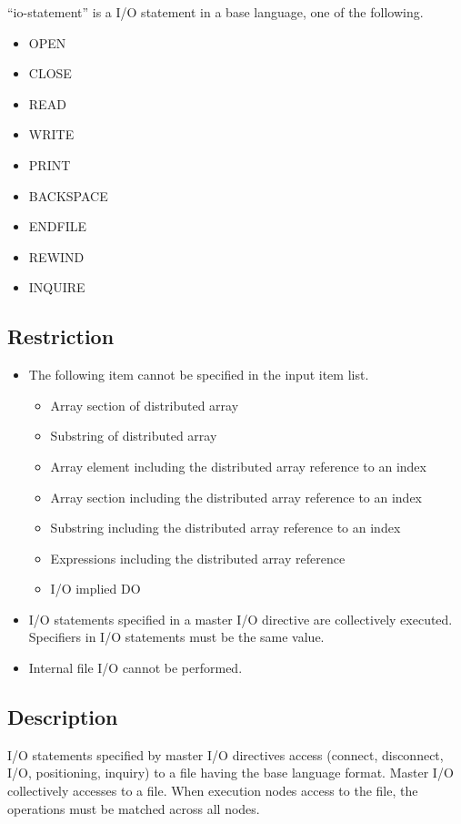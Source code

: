    ``io-statement'' is a I/O statement in a base language, one of the
   following.

   \begin{itemize}
    \item OPEN
    \item CLOSE
    \item READ
    \item WRITE
    \item PRINT
    \item BACKSPACE
    \item ENDFILE
    \item REWIND
    \item INQUIRE
   \end{itemize}

   \subsection{Restriction}
   \begin{itemize}
    \item The following item cannot be specified in the input item list.

	  \begin{itemize}
	   \item Array section of distributed array
	   \item Substring of distributed array
	   \item Array element including the distributed array reference
		 to an index
	   \item Array section including the distributed array reference
		 to an index
	   \item Substring including the distributed array reference to
		 an index
	   \item Expressions including the distributed array reference
	   \item I/O implied DO
	  \end{itemize}

    \item I/O statements specified in a master I/O directive are
	  collectively executed. Specifiers in I/O statements must be
	  the same value.
    \item Internal file I/O cannot be performed.
   \end{itemize}
	  
  \subsection{Description}
   I/O statements specified by master I/O directives access (connect,
   disconnect, I/O, positioning, inquiry)   to a file having
   the base language format.
   Master I/O collectively accesses to a file.
   When execution nodes access to the file, the operations must be
   matched across all nodes.

